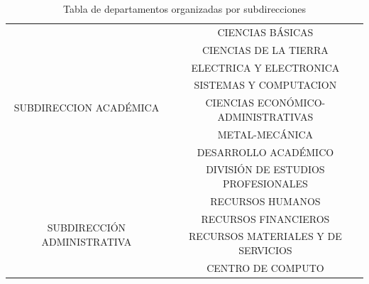 \begin{table}[h]
\centering
\caption{Tabla de departamentos organizadas por subdirecciones}
\label{tabDeptos}
\begin{tabular}{@{}cc@{}}
\toprule
\multirow{8}{*}{SUBDIRECCION ACAD\'EMICA}                                                                                   & CIENCIAS B\'ASICAS                                                                      \\ \cmidrule(l){2-2} 
& \multicolumn{1}{c}{CIENCIAS DE LA TIERRA}                                            \\ \cmidrule(l){2-2} 
& \multicolumn{1}{c}{ELECTRICA Y ELECTRONICA}                                          \\ \cmidrule(l){2-2} 
& \multicolumn{1}{c}{SISTEMAS Y COMPUTACION}                                           \\ \cmidrule(l){2-2} 
& \multicolumn{1}{c}{CIENCIAS ECON\'OMICO-ADMINISTRATIVAS}                               \\ \cmidrule(l){2-2} 
& \multicolumn{1}{c}{METAL-MEC\'ANICA}                                                   \\ \cmidrule(l){2-2} 
& \multicolumn{1}{c}{DESARROLLO ACAD\'EMICO}                                             \\ \cmidrule(l){2-2} 
& \multicolumn{1}{c}{DIVISI\'ON DE ESTUDIOS PROFESIONALES}                               \\ \midrule
\multicolumn{1}{c}{\multirow{5}{*}{SUBDIRECCI\'ON ADMINISTRATIVA}}                                                        & \multicolumn{1}{c}{RECURSOS HUMANOS}                                                 \\ \cmidrule(l){2-2} 
\multicolumn{1}{c}{}                                                                                                    & \multicolumn{1}{c}{RECURSOS FINANCIEROS}                                             \\ \cmidrule(l){2-2} 
\multicolumn{1}{c}{}                                                                                                    & \multicolumn{1}{c}{RECURSOS MATERIALES Y DE SERVICIOS}                               \\ \cmidrule(l){2-2} 
\multicolumn{1}{c}{}                                                                                                    & \multicolumn{1}{c}{CENTRO DE COMPUTO}                                                \\ \cmidrule(l){2-2} 

\end{tabular}
\end{table}
